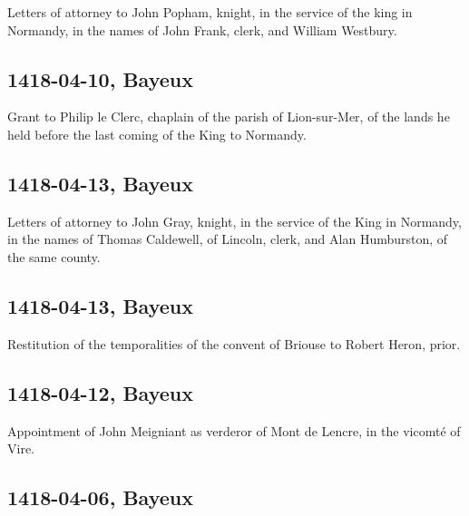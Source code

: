 \documentclass[a4paper,12pt,twoside]{book}
\begin{document}
                
                     Letters of attorney to John Popham, knight, in the service of the king in Normandy, in the names of John Frank, clerk, and William Westbury.
                  
                
                \subsection{1418-04-10, Bayeux}
                
                
                     Grant to Philip le Clerc, chaplain of the parish of Lion-sur-Mer, of the lands he held before the last coming of the King to Normandy.
                  
                
                \subsection{1418-04-13, Bayeux}
                
                
                     Letters of attorney to John Gray, knight, in the service of the King in Normandy, in the names of Thomas Caldewell, of Lincoln, clerk, and Alan Humburston, of the same county.
                  
                
                \subsection{1418-04-13, Bayeux}
                
                
                     Restitution of the temporalities of the convent of Briouse to Robert Heron, prior.
                  
                
                \subsection{1418-04-12, Bayeux}
                
                
                     Appointment of John Meigniant as verderor of Mont de Lencre, in the vicomté of Vire.
                  
                
                \subsection{1418-04-06, Bayeux}
                
\end{document}
